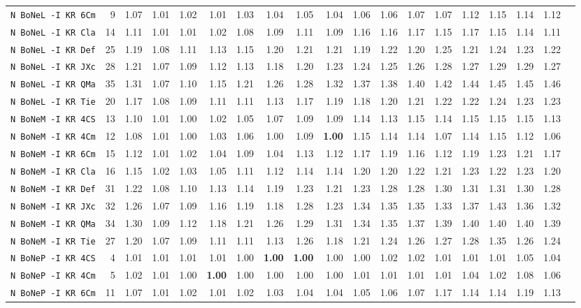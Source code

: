 \begin{tabular}{l | r @{~~} r | r@{~~}r@{~~}r@{~~}r@{~~}r@{~~}r@{~~}r@{~~}r@{~~}r@{~~}r@{~~}r@{~~}r@{~~}r@{~~}r@{~~}r@{~~}r|}
\verb+N BoNeL -I KR 6Cm+ & 9 & 1.07 & 1.01&1.02&1.01&1.03&1.04&1.05&1.04&1.06&1.06&1.07&1.07&1.12&1.15&1.14&1.12\\
\verb+N BoNeL -I KR Cla+ & 14 & 1.11 & 1.01&1.01&1.02&1.08&1.09&1.11&1.09&1.16&1.16&1.17&1.15&1.17&1.15&1.14&1.11\\
\verb+N BoNeL -I KR Def+ & 25 & 1.19 & 1.08&1.11&1.13&1.15&1.20&1.21&1.21&1.19&1.22&1.20&1.25&1.21&1.24&1.23&1.22\\
\verb+N BoNeL -I KR JXc+ & 28 & 1.21 & 1.07&1.09&1.12&1.13&1.18&1.20&1.23&1.24&1.25&1.26&1.28&1.27&1.29&1.29&1.27\\
\verb+N BoNeL -I KR QMa+ & 35 & 1.31 & 1.07&1.10&1.15&1.21&1.26&1.28&1.32&1.37&1.38&1.40&1.42&1.44&1.45&1.45&1.46\\
\verb+N BoNeL -I KR Tie+ & 20 & 1.17 & 1.08&1.09&1.11&1.11&1.13&1.17&1.19&1.18&1.20&1.21&1.22&1.22&1.24&1.23&1.23\\
\verb+N BoNeM -I KR 4CS+ & 13 & 1.10 & 1.01&1.00&1.02&1.05&1.07&1.09&1.09&1.14&1.13&1.15&1.14&1.15&1.15&1.15&1.13\\
\verb+N BoNeM -I KR 4Cm+ & 12 & 1.08 & 1.01&1.00&1.03&1.06&1.00&1.09&\textbf{1.00}&1.15&1.14&1.14&1.07&1.14&1.15&1.12&1.06\\
\verb+N BoNeM -I KR 6Cm+ & 15 & 1.12 & 1.01&1.02&1.04&1.09&1.04&1.13&1.12&1.17&1.19&1.16&1.12&1.19&1.23&1.21&1.17\\
\verb+N BoNeM -I KR Cla+ & 16 & 1.15 & 1.02&1.03&1.05&1.11&1.12&1.14&1.14&1.20&1.20&1.22&1.21&1.23&1.22&1.23&1.20\\
\verb+N BoNeM -I KR Def+ & 31 & 1.22 & 1.08&1.10&1.13&1.14&1.19&1.23&1.21&1.23&1.28&1.28&1.30&1.31&1.31&1.30&1.28\\
\verb+N BoNeM -I KR JXc+ & 32 & 1.26 & 1.07&1.09&1.16&1.19&1.18&1.28&1.23&1.34&1.35&1.35&1.33&1.37&1.43&1.36&1.32\\
\verb+N BoNeM -I KR QMa+ & 34 & 1.30 & 1.09&1.12&1.18&1.21&1.26&1.29&1.31&1.34&1.35&1.37&1.39&1.40&1.40&1.40&1.39\\
\verb+N BoNeM -I KR Tie+ & 27 & 1.20 & 1.07&1.09&1.11&1.11&1.13&1.26&1.18&1.21&1.24&1.26&1.27&1.28&1.35&1.26&1.24\\
\verb+N BoNeP -I KR 4CS+ & 4 & 1.01 & 1.01&1.01&1.01&1.00&\textbf{1.00}&\textbf{1.00}&1.00&1.00&1.02&1.02&1.01&1.01&1.01&1.05&1.04\\
\verb+N BoNeP -I KR 4Cm+ & 5 & 1.02 & 1.01&1.00&\textbf{1.00}&1.00&1.00&1.00&1.00&1.01&1.01&1.01&1.01&1.04&1.02&1.08&1.06\\
\verb+N BoNeP -I KR 6Cm+ & 11 & 1.07 & 1.01&1.02&1.01&1.02&1.03&1.04&1.04&1.05&1.06&1.07&1.17&1.14&1.14&1.19&1.13\\

\end{tabular}
